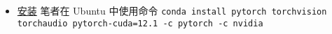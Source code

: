 

\begin{itemize}
\item \href{https://pytorch.org/get-started/locally/}{安装} 笔者在 Ubuntu 中使用命令 \verb|conda install pytorch torchvision torchaudio pytorch-cuda=12.1 -c pytorch -c nvidia|
\end{itemize}
